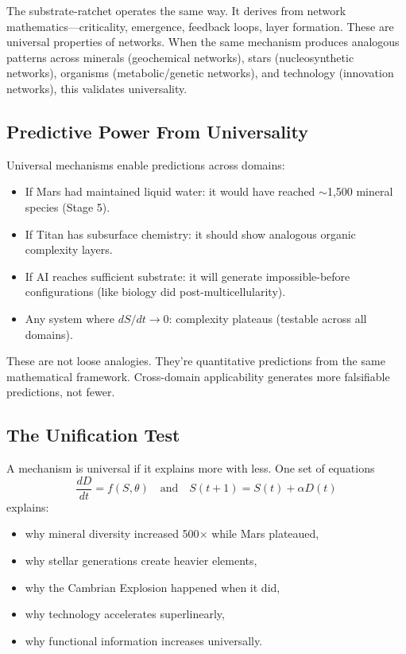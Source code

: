 \documentclass[12pt,a4paper]{article}
\begin{document}
The substrate-ratchet operates the same way. It derives from network mathematics---criticality, emergence, feedback loops, layer formation. These are universal properties of networks. When the same mechanism produces analogous patterns across minerals (geochemical networks), stars (nucleosynthetic networks), organisms (metabolic/genetic networks), and technology (innovation networks), this validates universality.

\subsection{Predictive Power From Universality}

Universal mechanisms enable predictions across domains:

\begin{itemize}
    \item If Mars had maintained liquid water: it would have reached $\sim$1{,}500 mineral species (Stage 5).
    \item If Titan has subsurface chemistry: it should show analogous organic complexity layers.
    \item If AI reaches sufficient substrate: it will generate impossible-before configurations (like biology did post-multicellularity).
    \item Any system where $dS/dt \rightarrow 0$: complexity plateaus (testable across all domains).
\end{itemize}

These are not loose analogies. They're quantitative predictions from the same mathematical framework. Cross-domain applicability generates more falsifiable predictions, not fewer.

\subsection{The Unification Test}

A mechanism is universal if it explains more with less. One set of equations
\[
\frac{dD}{dt} = f(S,\theta) \quad \text{and} \quad S(t+1) = S(t) + \alpha D(t)
\]
explains:
\begin{itemize}
    \item why mineral diversity increased 500$\times$ while Mars plateaued,
    \item why stellar generations create heavier elements,
    \item why the Cambrian Explosion happened when it did,
    \item why technology accelerates superlinearly,
    \item why functional information increases universally.
\end{itemize}
\end{document}
